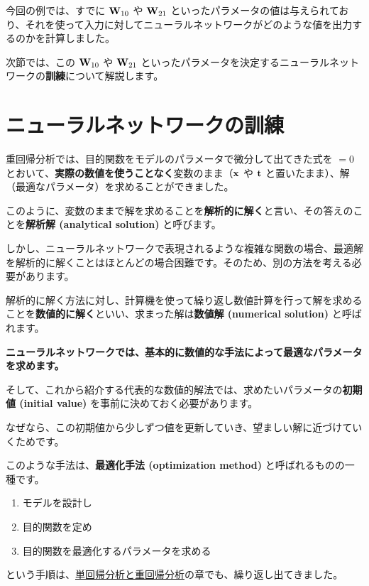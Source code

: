 今回の例では、すでに ${\bf W}_{10}$ や ${\bf W}_{21}$ といったパラメータの値は与えられており、それを使って入力に対してニューラルネットワークがどのような値を出力するのかを計算しました。


次節では、この ${\bf W}_{10}$ や ${\bf W}_{21}$ といったパラメータを決定するニューラルネットワークの\textbf{訓練}について解説します。


\section{ニューラルネットワークの訓練}


重回帰分析では、目的関数をモデルのパラメータで微分して出てきた式を $= 0$ とおいて、\textbf{実際の数値を使うことなく}変数のまま（${\bf x}$ や ${\bf t}$ と置いたまま）、解（最適なパラメータ）を求めることができました。

このように、変数のままで解を求めることを\textbf{解析的に解く}と言い、その答えのことを\textbf{解析解 (analytical solution)} と呼びます。


しかし、ニューラルネットワークで表現されるような複雑な関数の場合、最適解を解析的に解くことはほとんどの場合困難です。そのため、別の方法を考える必要があります。


解析的に解く方法に対し、計算機を使って繰り返し数値計算を行って解を求めることを\textbf{数値的に解く}といい、求まった解は\textbf{数値解 (numerical solution)} と呼ばれます。


\textbf{ニューラルネットワークでは、基本的に数値的な手法によって最適なパラメータを求めます。}


そして、これから紹介する代表的な数値的解法では、求めたいパラメータの\textbf{初期値 (initial value)} を事前に決めておく必要があります。

なぜなら、この初期値から少しずつ値を更新していき、望ましい解に近づけていくためです。


このような手法は、\textbf{最適化手法 (optimization method)} と呼ばれるものの一種です。


\begin{enumerate}
\item モデルを設計し
\item 目的関数を定め
\item 目的関数を最適化するパラメータを求める
\end{enumerate}


という手順は、\href{https://tutorials.chainer.org/ja/07_Regression_Analysis.html}{単回帰分析と重回帰分析}の章でも、繰り返し出てきました。

